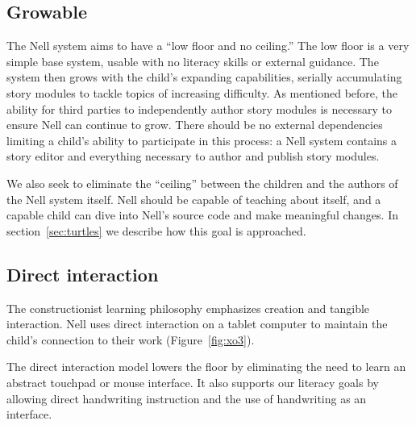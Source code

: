 \documentclass[preprint]{sig-alternate}
\begin{document}
\subsection{Growable}


The Nell system aims to have a ``low floor and no ceiling.''  The low
floor is a very simple base system, usable with no literacy skills or
external guidance.  The system then grows with the child's expanding
capabilities, serially accumulating story modules to tackle topics of
increasing difficulty.  As mentioned before, the ability for third
parties to independently author story modules is necessary to ensure
Nell can continue to grow.  There should be no external dependencies
limiting a child's ability to participate in this process: a Nell
system contains a story editor and everything necessary to
author and publish story modules.

We also seek to eliminate the ``ceiling'' between the children and
the authors of the Nell system itself.  Nell should be capable of
teaching about itself, and a capable child can dive into Nell's source
code and make meaningful changes.  In section~\ref{sec:turtles} we
describe how this goal is approached.


\subsection{Direct interaction}

The constructionist learning philosophy emphasizes creation and
tangible interaction.  Nell uses direct interaction on a tablet
computer to maintain the child's connection to their work
(Figure~\ref{fig:xo3}).

The direct interaction model lowers the floor by eliminating the need
to learn an abstract touchpad or mouse interface.  It also supports
our literacy goals by allowing direct handwriting instruction and the
use of handwriting as an interface.
\end{document}
